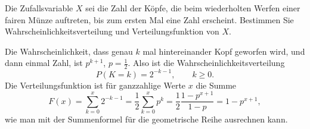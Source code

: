 Die Zufallsvariable $X$ sei die Zahl der Köpfe, die beim
wiederholten Werfen einer fairen Münze auftreten, bis zum
ersten Mal eine Zahl erscheint. Bestimmen Sie Wahrscheinlichkeitsverteilung
und Verteilungsfunktion von $X$.


\begin{loesung}
Die Wahrscheinlichkeit, dass genau $k$ mal hintereinander Kopf geworfen
wird, und dann einmal Zahl, ist $p^{k+1}$, $p=\frac12$. Also ist die
Wahrscheinlichkeitsverteilung
\[
P(K=k)=2^{-k-1},\qquad k\ge 0.
\]
Die Verteilungsfunktion ist für ganzzahlige Werte $x$ die Summe
\[
F(x)=\sum_{k=0}^x2^{-k-1}=\frac12\sum_{k=0}^x p^k=\frac12 \frac{1-p^{x+1}}{1-p}
=1-p^{x+1},
\]
wie man mit der Summenformel für die geometrische Reihe ausrechnen kann.
\end{loesung}

